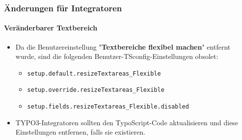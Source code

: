 %

\begin{frame}[fragile]
	\frametitle{Änderungen für Integratoren}
	\framesubtitle{Veränderbarer Textbereich}

	\begin{itemize}
		\item Da die Benutzereinstellung "\textbf{Textbereiche flexibel machen}" entfernt wurde,
			sind die folgenden Benutzer-TSconfig-Einstellungen obsolet:

			\begin{itemize}
				\item \texttt{setup.default.resizeTextareas\_Flexible}
				\item \texttt{setup.override.resizeTextareas\_Flexible}
				\item \texttt{setup.fields.resizeTextareas\_Flexible.disabled}
			\end{itemize}

		\item TYPO3-Integratoren sollten den TypoScript-Code aktualisieren und diese
			Einstellungen entfernen, falls sie existieren.

	\end{itemize}
\end{frame}


